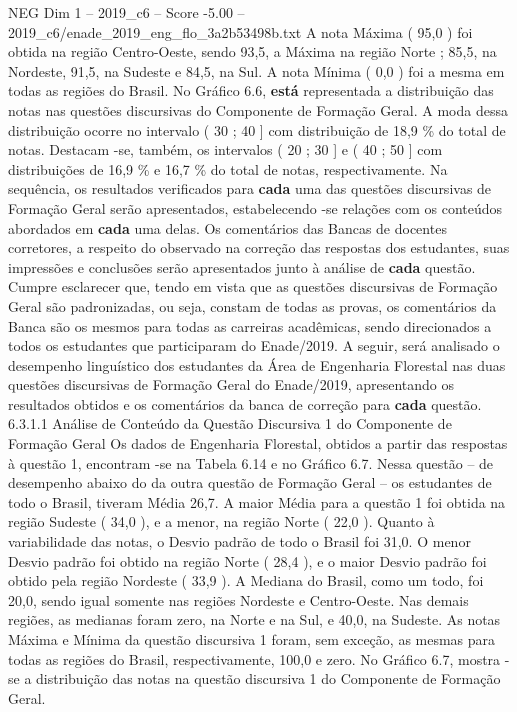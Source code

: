 \begin{textsample}{NEG Dim 1 – 2019\_c6 – Score -5.00 – 2019\_c6/enade\_2019\_eng\_flo\_3a2b53498b.txt}
A nota Máxima ( 95,0 ) foi obtida na região Centro-Oeste, sendo 93,5, a Máxima na região Norte ; 85,5, na Nordeste, 91,5, na Sudeste e 84,5, na Sul.
A nota Mínima ( 0,0 ) foi a mesma em todas as regiões do Brasil.
No Gráfico 6.6, \textbf{está} representada a distribuição das notas nas questões discursivas do Componente de Formação Geral.
A moda dessa distribuição ocorre no intervalo ( 30 ; 40 ] com distribuição de 18,9 \% do total de notas.
Destacam -se, também, os intervalos ( 20 ; 30 ] e ( 40 ; 50 ] com distribuições de 16,9 \% e 16,7 \% do total de notas, respectivamente.
Na sequência, os resultados verificados para \textbf{cada} uma das questões discursivas de Formação Geral serão apresentados, estabelecendo -se relações com os conteúdos abordados em \textbf{cada} uma delas.
Os comentários das Bancas de docentes corretores, a respeito do observado na correção das respostas dos estudantes, suas impressões e conclusões serão apresentados junto à análise de \textbf{cada} questão.
Cumpre esclarecer que, tendo em vista que as questões discursivas de Formação Geral são padronizadas, ou seja, constam de todas as provas, os comentários da Banca são os mesmos para todas as carreiras acadêmicas, sendo direcionados a todos os estudantes que participaram do Enade/2019.
A seguir, será analisado o desempenho linguístico dos estudantes da Área de Engenharia Florestal nas duas questões discursivas de Formação Geral do Enade/2019, apresentando os resultados obtidos e os comentários da banca de correção para \textbf{cada} questão. 6.3.1.1 Análise de Conteúdo da Questão Discursiva 1 do Componente de Formação Geral Os dados de Engenharia Florestal, obtidos a partir das respostas à questão 1, encontram -se na Tabela 6.14 e no Gráfico 6.7.
Nessa questão – de desempenho abaixo do da outra questão de Formação Geral – os estudantes de todo o Brasil, tiveram Média 26,7.
A maior Média para a questão 1 foi obtida na região Sudeste ( 34,0 ), e a menor, na região Norte ( 22,0 ).
Quanto à variabilidade das notas, o Desvio padrão de todo o Brasil foi 31,0.
O menor Desvio padrão foi obtido na região Norte ( 28,4 ), e o maior Desvio padrão foi obtido pela região Nordeste ( 33,9 ).
A Mediana do Brasil, como um todo, foi 20,0, sendo igual somente nas regiões Nordeste e Centro-Oeste.
Nas demais regiões, as medianas foram zero, na Norte e na Sul, e 40,0, na Sudeste.
As notas Máxima e Mínima da questão discursiva 1 foram, sem exceção, as mesmas para todas as regiões do Brasil, respectivamente, 100,0 e zero.
No Gráfico 6.7, mostra -se a distribuição das notas na questão discursiva 1 do Componente de Formação Geral.

\end{textsample}
